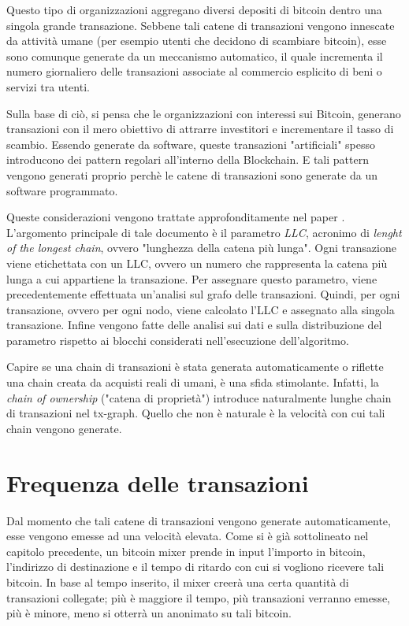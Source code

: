 Questo tipo di organizzazioni aggregano diversi depositi di bitcoin dentro una singola grande transazione.  Sebbene tali catene di transazioni vengono innescate da attività umane (per esempio utenti che decidono di scambiare bitcoin), esse sono comunque generate da un meccanismo automatico, il quale incrementa il numero giornaliero delle transazioni associate al commercio esplicito di beni o servizi tra utenti.

Sulla base di ciò, si pensa che le organizzazioni con interessi sui Bitcoin, generano transazioni con il mero obiettivo di attrarre investitori e incrementare il tasso di scambio. Essendo generate da software, queste transazioni "artificiali" spesso introducono dei pattern regolari all'interno della Blockchain. E tali pattern vengono generati proprio perchè le catene di transazioni sono generate da un software programmato. 

Queste considerazioni vengono trattate approfonditamente nel paper \cite{ddp-ltcbh-17}. L'argomento principale di tale documento è il parametro \textit{LLC}, acronimo di \textit{lenght of the longest chain}, ovvero "lunghezza della catena più lunga". Ogni transazione viene etichettata con un LLC, ovvero un numero che rappresenta la catena più lunga a cui appartiene la transazione. Per assegnare questo parametro, viene precedentemente effettuata un'analisi sul grafo delle transazioni. Quindi, per ogni transazione, ovvero per ogni nodo, viene calcolato l'LLC e assegnato alla singola transazione. Infine vengono fatte delle analisi sui dati e sulla distribuzione del parametro rispetto ai blocchi considerati nell'esecuzione dell'algoritmo.

Capire se una chain di transazioni è stata generata automaticamente o riflette una chain creata da acquisti reali di umani, è una sfida stimolante. Infatti, la \textit{chain of ownership} ("catena di proprietà") introduce naturalmente lunghe chain di transazioni nel tx-graph. Quello che non è naturale è la velocità con cui tali chain vengono generate. 

\section{Frequenza delle transazioni}

Dal momento che tali catene di transazioni vengono generate automaticamente, esse vengono emesse ad una velocità elevata. Come si è già sottolineato nel capitolo precedente, un bitcoin mixer prende in input l'importo in bitcoin, l'indirizzo di destinazione e il tempo di ritardo con cui si vogliono ricevere tali bitcoin. In base al tempo inserito, il mixer creerà una certa quantità di transazioni collegate; più è maggiore il tempo, più transazioni verranno emesse, più è minore, meno si otterrà un anonimato su tali bitcoin.

